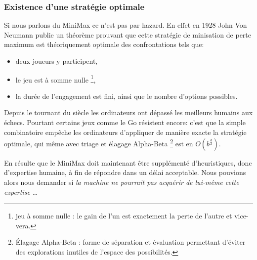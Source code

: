 \subsubsection{Existence d'une stratégie optimale}

Si nous parlons du \og MiniMax \fg{} ce n'est pas par hazard. En effet en 1928 John Von Neumann publie un théorème prouvant que cette stratégie de minisation de perte maximum est théoriquement optimale des confrontations tels que:

\begin{itemize}
\item deux \og joueurs \fg{} y participent,
\item le \og jeu \fg est à \og somme nulle \fg{} \footnote{ jeu à \og somme nulle \fg{}: le gain de l'un est exactement la perte de l'autre et vice-vera. },
\item la durée de l'engagement est fini, ainsi que le nombre d'options possibles.
\end{itemize}

Depuis le tournant du siècle les ordinateurs ont dépassé les meilleurs humains aux échecs. Pourtant certains jeux comme le Go résistent encore: c'est que la simple combinatoire empêche les ordinateurs d'appliquer de manière exacte la stratégie optimale, qui même avec triage et élagage \og Alpha-Beta \fg \footnote{ \og Élagage Alpha-Beta \fg : forme de séparation et évaluation permettant d'éviter des explorations inutiles de l'espace des possibilités. } est en $O(b^{\frac{d}{2}})$.

En résulte que le \og MiniMax \fg{} doit maintenant être supplémenté d'heuristiques, donc d'expertise humaine, à fin de répondre dans un délai acceptable. Nous pouvions alors nous demander si \emph{la machine ne pourrait pas acquérir de lui-même cette expertise \dots }